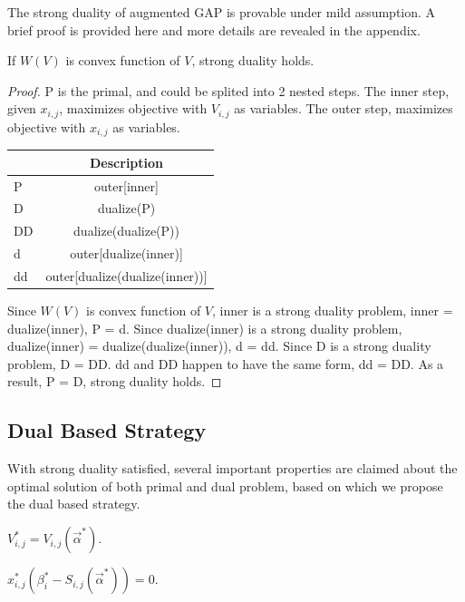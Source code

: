 \documentclass[sigconf]{acmart}
\newcommand{\sx}{x_{i,j}}
\newcommand{\sV}{V_{i,j}}
\newcommand{\sbeta}{\beta_i}
\newcommand{\sS}{S_{i,j}}
\newcommand{\valpha}{\vec{\alpha}}
\begin{document}
The strong duality of augmented GAP is provable under mild assumption.
A brief proof is provided here and more details are revealed in the appendix.

\begin{theorem}
If $W(V)$ is convex function of $V$, strong duality holds.
\end{theorem}

\begin{proof}
P is the primal, and could be splited into 2 nested steps.
The inner step, given $\sx$, maximizes objective with $\sV$ as variables.
The outer step, maximizes objective with $\sx$ as variables.

\begin{center}
\begin{tabular}{|l|c|}
\hline
\quad  & Description \\
\hline
P      & outer[inner] \\
\hline
D      & dualize(P) \\
\hline
DD     & dualize(dualize(P)) \\
\hline
d      & outer[dualize(inner)] \\
\hline
dd     & outer[dualize(dualize(inner))] \\
\hline
\end{tabular}
\end{center}

Since $W(V)$ is convex function of $V$, inner is a strong duality problem, inner = dualize(inner), P = d.
Since dualize(inner) is a strong duality problem, dualize(inner) = dualize(dualize(inner)), d = dd.
Since D is a strong duality problem, D = DD.
dd and DD happen to have the same form, dd = DD.
As a result, P = D, strong duality holds.
\end{proof}

\subsection{Dual Based Strategy}

With strong duality satisfied, several important properties are claimed about the optimal solution of both primal and dual problem,
    based on which we propose the dual based strategy.

\begin{theorem}
$\sV^* = \sV(\valpha^*)$.
\end{theorem}

\begin{theorem}
$\sx^*(\sbeta^* - \sS(\valpha^*)) = 0$.
\end{theorem}
\end{document}
